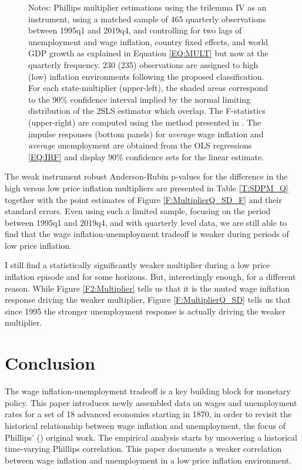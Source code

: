 \documentclass[12pt]{article}
\newcommand{\annote}[1]{\parbox{\textwidth}{\renewcommand{\baselinestretch}{1.0}\vspace{12pt} \footnotesize Notes: #1}}
\begin{document}
\begin{figure}[h!]
\begin{subfigure}[b]{0.9\textwidth}
		\end{subfigure}
		\annote{Phillips multiplier estimations using the trilemma IV as an instrument, using a matched sample of 465 quarterly observations between 1995q1 and 2019q4, and controlling for two lags of unemployment and wage inflation, country fixed effects, and world GDP growth as explained in Equation \eqref{EQ:MULT} but now at the quarterly frequency. 230 (235) observations are assigned to high (low) inflation environments following the proposed classification. For each state-multiplier (upper-left), the shaded areas correspond to the 90\% confidence interval implied by the normal limiting distribution of the 2SLS estimator which overlap. The F-statistics (upper-right) are computed using the method presented in \cite{Olea2013}. The impulse responses (bottom panels) for \textit{average} wage inflation and \textit{average} unemployment are obtained from the OLS regressions \eqref{EQ:IRF} and display 90\% confidence sets for the linear estimate.}
	
\end{figure}

The weak instrument robust Anderson-Rubin p-values for the difference in the high versus low price inflation multipliers are presented in Table \ref{T:SDPM_Q} together with the point estimates of Figure \ref{F:MultiplierQ_SD_F} and their standard errors. Even using such a limited sample, focusing on the period between 1995q1 and 2019q4, and with quarterly level data, we are still able to find that the wage inflation-unemployment tradeoff is weaker during periods of low price inflation.

I still find a statistically significantly weaker multiplier during a low price inflation episode and for some horizons. But, interestingly enough, for a different reason. While Figure \ref{F2:Multiplier} tells us that it is the muted wage inflation response driving the weaker multiplier, Figure \ref{F:MultiplierQ_SD} tells us that since 1995 the stronger unemployment response is actually driving the weaker multiplier.


\section{Conclusion \label{S_Conclusion}}
 
The wage inflation-unemployment tradeoff is a key building block for monetary policy. This paper introduces newly assembled data on wages and unemployment rates for a set of 18 advanced economies starting in 1870, in order to revisit the historical relationship between wage inflation and unemployment, the focus of Phillips' (\citeyear{Phillips1958}) original work. The empirical analysis starts by uncovering a historical time-varying Phillips correlation. This paper documents a weaker correlation between wage inflation and unemployment in a low price inflation environment.
\end{document}
